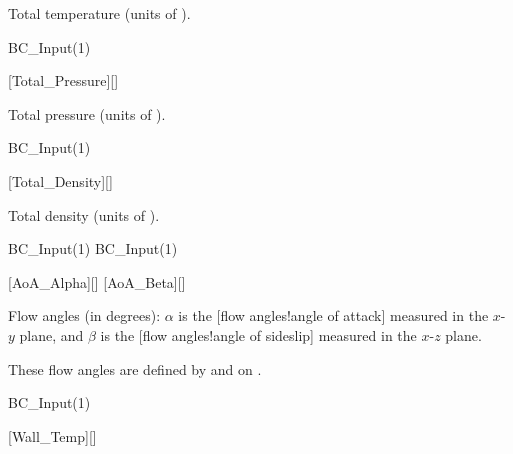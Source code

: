 \begin{nmldescbody}
Total temperature (units of \unitTemp{}).
\end{nmldescbody}


\begin{nmldescitem}
BC_Input(1)%
\end{nmldescitem}
[Total\_Pressure][]

\begin{nmldescbody}
Total pressure (units of \unitPres).
\end{nmldescbody}


\begin{nmldescitem}
BC_Input(1)%
\end{nmldescitem}
[Total\_Density][]

\begin{nmldescbody}
Total density (units of \unitDens{}).
\end{nmldescbody}


\begin{nmldescitem}
BC_Input(1)%
BC_Input(1)%
\end{nmldescitem}
[AoA\_Alpha][]
[AoA\_Beta][]

\begin{nmldescbody}
Flow angles (in degrees):
$\alpha$ is the
[flow angles!angle of attack]
measured in the $x$-$y$ plane, and
$\beta$  is the
[flow angles!angle of sideslip]
measured in the $x$-$z$ plane.


%
These flow angles are defined by
 and
 on \pref{\pageref{FIG:FlowAngle}}.
\end{nmldescbody}


\begin{nmldescitem}
BC_Input(1)%
\end{nmldescitem}
[Wall\_Temp][]

